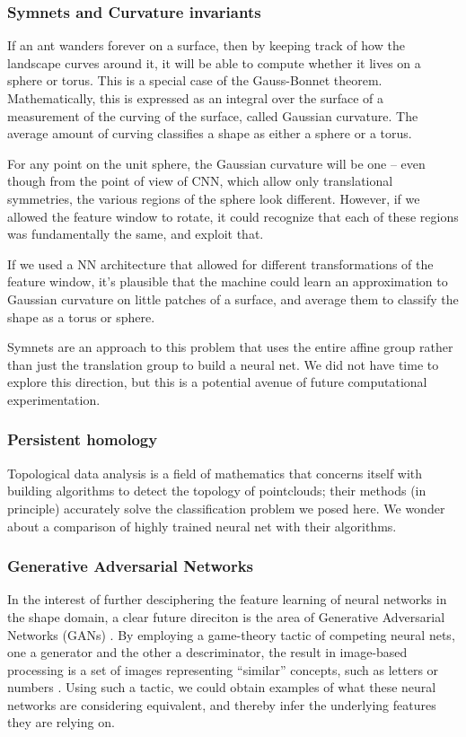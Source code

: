 \documentclass{article}
\begin{document}
\subsubsection{Symnets and Curvature invariants}

If an ant wanders forever on a surface, then by keeping track of how the landscape
curves around it, it will be able to compute whether it lives on a sphere or torus. This is a special case of the Gauss-Bonnet theorem.
Mathematically, this is expressed as an integral over the surface of a measurement
of the curving of the surface, called Gaussian curvature. The average amount of curving classifies a shape as either a sphere or a torus.

For any point on the unit sphere, the Gaussian curvature will be one -- even though from the point of view of CNN, which allow
only translational symmetries, the various regions of the sphere look different. However,
if we allowed the feature window to rotate, it could recognize that each of these regions was
fundamentally the same, and exploit that.

If we used a NN architecture that allowed for different transformations of the feature window,
it's plausible that the machine could learn an approximation to Gaussian curvature on
little patches of a surface, and average them to classify the shape as a torus or sphere.

Symnets \cite{symnets} are an approach to this problem that uses the entire affine group rather than just the translation group
to build a neural net. We did not have time to explore this direction, but this is a potential avenue of future computational experimentation.

\subsubsection{Persistent homology}

Topological data analysis is a field of mathematics that concerns itself with building algorithms
to detect the topology of pointclouds; their methods (in principle) accurately solve the classification problem we posed here. We wonder about a comparison of highly trained neural net with their algorithms.

\subsubsection{Generative Adversarial Networks}

In the interest of further desciphering the feature learning of neural networks in the
shape domain, a clear future direciton is the area of Generative Adversarial Networks
(GANs) \cite{goodfellow2016nips}. By employing a game-theory tactic of competing neural nets,
one a generator and the other a descriminator, the result in image-based processing is a set
of images representing ``similar'' concepts, such as letters or numbers \cite{kataoka2016image}.
Using such a tactic, we could obtain examples of what these neural networks are considering
equivalent, and thereby infer the underlying features they are relying on.
\end{document}
